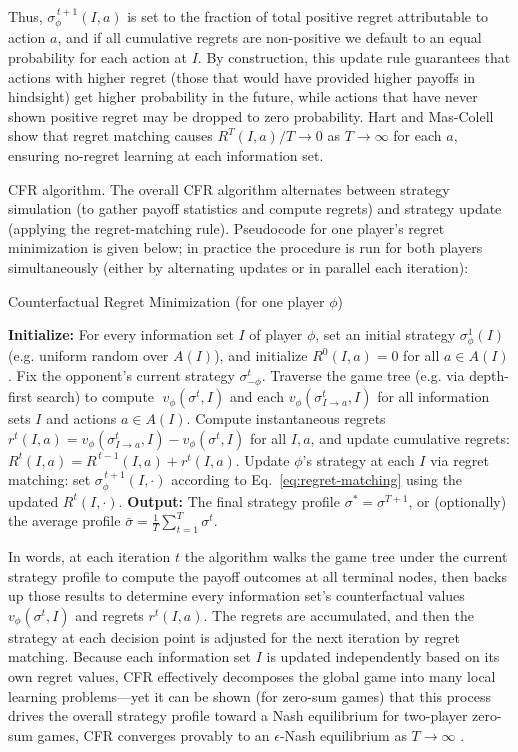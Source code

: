 \documentclass{article}
\begin{document}
Thus, $\sigma_{\phi}^{\,t+1}(I,a)$ is set to the fraction of total positive regret attributable to action $a$, and if all cumulative regrets are non-positive we default to an equal probability for each action at $I$. By construction, this update rule guarantees that actions with higher regret (those that would have provided higher payoffs in hindsight) get higher probability in the future, while actions that have never shown positive regret may be dropped to zero probability. Hart and Mas-Colell show that regret matching causes $R^T(I,a)/T \to 0$ as $T\to\infty$ for each $a$, ensuring no-regret learning at each information set.

CFR algorithm. The overall CFR algorithm alternates between strategy simulation (to gather payoff statistics and compute regrets) and strategy update (applying the regret-matching rule). Pseudocode for one player’s regret minimization is given below; in practice the procedure is run for both players simultaneously (either by alternating updates or in parallel each iteration):

\begin{algorithm}[ht]
\caption{Counterfactual Regret Minimization (for one player $\phi$)}\label{alg:CFR}
\begin{algorithmic}[1]
\State \textbf{Initialize:} For every information set $I$ of player $\phi$, set an initial strategy $\sigma_{\phi}^1(I)$ (e.g. uniform random over $A(I)$), and initialize $R^0(I,a)=0$ for all $a\in A(I)$.
    \State Fix the opponent’s current strategy $\sigma_{-\phi}^t$. Traverse the game tree (e.g. via depth-first search) to compute $\;v_\phi(\sigma^t, I)$ and each $v_\phi(\sigma^t_{I\to a}, I)$ for all information sets $I$ and actions $a\in A(I)$.
    \State Compute instantaneous regrets $r^t(I,a) = v_\phi(\sigma^t_{I\to a}, I) - v_\phi(\sigma^t, I)$ for all $I,a$, and update cumulative regrets: $R^t(I,a) = R^{\,t-1}(I,a) + r^t(I,a)$.
    \State Update $\phi$’s strategy at each $I$ via regret matching: set $\sigma_{\phi}^{\,t+1}(I,\cdot)$ according to Eq.~\eqref{eq:regret-matching} using the updated $R^t(I,\cdot)$.
\EndFor
\State \textbf{Output:} The final strategy profile $\sigma^* = \sigma^{T+1}$, or (optionally) the average profile $\bar{\sigma} = \frac{1}{T}\sum_{t=1}^T \sigma^t$. 
\end{algorithmic}
\end{algorithm}

In words, at each iteration $t$ the algorithm walks the game tree under the current strategy profile to compute the payoff outcomes at all terminal nodes, then backs up those results to determine every information set’s counterfactual values $v_\phi(\sigma^t,I)$ and regrets $r^t(I,a)$. The regrets are accumulated, and then the strategy at each decision point is adjusted for the next iteration by regret matching. Because each information set $I$ is updated independently based on its own regret values, CFR effectively decomposes the global game into many local learning problems—yet it can be shown (for zero-sum games) that this process drives the overall strategy profile toward a Nash equilibrium for two-player zero-sum games, CFR converges provably to an $\epsilon$-Nash equilibrium as $T \to \infty$ \cite{zinkevichetal}.
\end{document}
